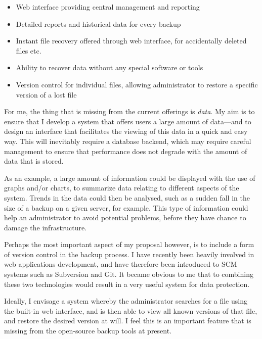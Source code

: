 \documentclass[a4paper]{article}
\begin{document}
    \begin{itemize}
        \item Web interface providing central management and reporting
        \item Detailed reports and historical data for every backup
        \item Instant file recovery offered through web interface, for
            accidentally deleted files etc.
        \item Ability to recover data without any special software or tools
        \item Version control for individual files, allowing administrator to
            restore a specific version of a lost file
    \end{itemize}

    For me, the thing that is missing from the current offerings is
    \emph{data}. My aim is to ensure that I develop a system that offers users
    a large amount of data---and to design an interface that facilitates the
    viewing of this data in a quick and easy way. This will inevitably require
    a database backend, which may require careful management to ensure that
    performance does not degrade with the amount of data that is stored.

    As an example, a large amount of information could be displayed with the
    use of graphs and/or charts, to summarize data relating to different
    aspects of the system. Trends in the data could then be analysed, such as
    a sudden fall in the size of a backup on a given server, for example. This
    type of information could help an administrator to avoid potential
    problems, before they have chance to damage the infrastructure.

    Perhaps the most important aspect of my proposal however, is to include
    a form of version control in the backup process. I have recently been
    heavily involved in web applications development, and have therefore been
    introduced to SCM systems such as Subversion and Git. It became obvious to
    me that to combining these two technologies would result in a very useful
    system for data protection.

    Ideally, I envisage a system whereby the administrator searches for a file
    using the built-in web interface, and is then able to view all known
    versions of that file, and restore the desired version at will.  I feel
    this is an important feature that is missing from the open-source backup
    tools at present.
    
\end{document}
